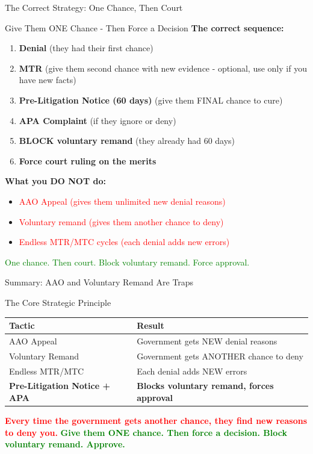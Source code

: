 \documentclass[11pt]{beamer}
\begin{document}
	\begin{frame}{The Correct Strategy: One Chance, Then Court}
		\scriptsize
		\begin{block}{Give Them ONE Chance - Then Force a Decision}
			\textbf{The correct sequence:}
			\vspace{0.2cm}
			\begin{enumerate}
				\item \textbf{Denial} (they had their first chance)
				\item \textbf{MTR} (give them second chance with new evidence - optional, use only if you have new facts)
				\item \textbf{Pre-Litigation Notice (60 days)} (give them FINAL chance to cure)
				\item \textbf{APA Complaint} (if they ignore or deny)
				\item \textbf{BLOCK voluntary remand} (they already had 60 days)
				\item \textbf{Force court ruling on the merits}
			\end{enumerate}
			\textbf{What you DO NOT do:}
			\begin{itemize}
				\item \textcolor{red}{AAO Appeal (gives them unlimited new denial reasons)}
				\item \textcolor{red}{Voluntary remand (gives them another chance to deny)}
				\item \textcolor{red}{Endless MTR/MTC cycles (each denial adds new errors)}
			\end{itemize}
			\textcolor{green}{One chance. Then court. Block voluntary remand. Force approval.}
		\end{block}
	\end{frame}
	
	\begin{frame}{Summary: AAO and Voluntary Remand Are Traps}
		\scriptsize
		\begin{block}{The Core Strategic Principle}
			\centering
			\begin{tabular}{|p{5cm}|p{4cm}|}
				\hline
				\textbf{Tactic} & \textbf{Result} \\
				\hline
				AAO Appeal & Government gets NEW denial reasons \\
				\hline
				Voluntary Remand & Government gets ANOTHER chance to deny \\
				\hline
				Endless MTR/MTC & Each denial adds NEW errors \\
				\hline
				\textbf{Pre-Litigation Notice + APA} & \textbf{Blocks voluntary remand, forces approval} \\
				\hline
			\end{tabular}
			\vspace{0.3cm}
			\textcolor{red}{\textbf{Every time the government gets another chance, they find new reasons to deny you.}}
			\vspace{0.2cm}
			\textcolor{green}{\textbf{Give them ONE chance. Then force a decision. Block voluntary remand. Approve.}}
		\end{block}
	\end{frame}
	
\end{document}
